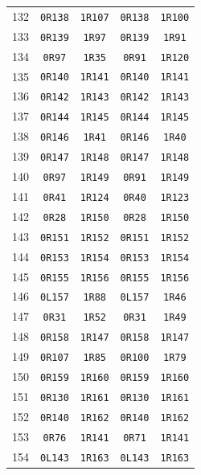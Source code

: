 \begin{longtable}{rcccc}
132 & \texttt{0R138} & \texttt{1R107} & \texttt{0R138} & \texttt{1R100} \\
133 & \texttt{0R139} & \texttt{1R97} & \texttt{0R139} & \texttt{1R91} \\
134 & \texttt{0R97} & \texttt{1R35} & \texttt{0R91} & \texttt{1R120} \\
135 & \texttt{0R140} & \texttt{1R141} & \texttt{0R140} & \texttt{1R141} \\
136 & \texttt{0R142} & \texttt{1R143} & \texttt{0R142} & \texttt{1R143} \\
137 & \texttt{0R144} & \texttt{1R145} & \texttt{0R144} & \texttt{1R145} \\
138 & \texttt{0R146} & \texttt{1R41} & \texttt{0R146} & \texttt{1R40} \\
139 & \texttt{0R147} & \texttt{1R148} & \texttt{0R147} & \texttt{1R148} \\
140 & \texttt{0R97} & \texttt{1R149} & \texttt{0R91} & \texttt{1R149} \\
141 & \texttt{0R41} & \texttt{1R124} & \texttt{0R40} & \texttt{1R123} \\
142 & \texttt{0R28} & \texttt{1R150} & \texttt{0R28} & \texttt{1R150} \\
143 & \texttt{0R151} & \texttt{1R152} & \texttt{0R151} & \texttt{1R152} \\
144 & \texttt{0R153} & \texttt{1R154} & \texttt{0R153} & \texttt{1R154} \\
145 & \texttt{0R155} & \texttt{1R156} & \texttt{0R155} & \texttt{1R156} \\
146 & \texttt{0L157} & \texttt{1R88} & \texttt{0L157} & \texttt{1R46} \\
147 & \texttt{0R31} & \texttt{1R52} & \texttt{0R31} & \texttt{1R49} \\
148 & \texttt{0R158} & \texttt{1R147} & \texttt{0R158} & \texttt{1R147} \\
149 & \texttt{0R107} & \texttt{1R85} & \texttt{0R100} & \texttt{1R79} \\
150 & \texttt{0R159} & \texttt{1R160} & \texttt{0R159} & \texttt{1R160} \\
151 & \texttt{0R130} & \texttt{1R161} & \texttt{0R130} & \texttt{1R161} \\
152 & \texttt{0R140} & \texttt{1R162} & \texttt{0R140} & \texttt{1R162} \\
153 & \texttt{0R76} & \texttt{1R141} & \texttt{0R71} & \texttt{1R141} \\
154 & \texttt{0L143} & \texttt{1R163} & \texttt{0L143} & \texttt{1R163} \\

\end{longtable}
